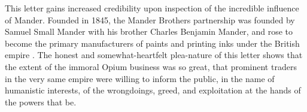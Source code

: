 \documentclass{article}
\begin{document}
This letter gains increased credibility upon inspection of the incredible influence of Mander. Founded in 1845, the Mander Brothers partnership was founded by Samuel Small Mander with his brother Charles Benjamin Mander, and rose to become the primary manufacturers of paints and printing inks under the British empire \autocite{Mander:1955}. The honest and somewhat-heartfelt plea-nature of this letter shows that the extent of the immoral Opium business was so great, that prominent traders in the very same empire were willing to inform the public, in the name of humanistic interests, of the wrongdoings, greed, and exploitation at the hands of the powers that be.



\pagebreak
\printbibliography[title={Cited Works}, heading=bibintoc]
\end{document}
